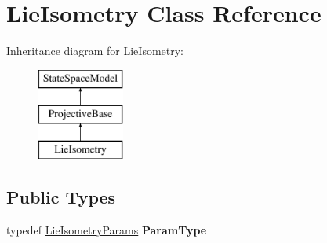 \hypertarget{classLieIsometry}{\section{Lie\-Isometry Class Reference}
\label{classLieIsometry}
}
Inheritance diagram for Lie\-Isometry\-:\begin{figure}[H]
\begin{center}
\leavevmode
\includegraphics[height=3.000000cm]{classLieIsometry}
\end{center}
\end{figure}
\subsection*{Public Types}
\begin{DoxyCompactItemize}
\item 
\hypertarget{classLieIsometry_afbaaa2c77ab69459280d40abe3621749}{typedef \hyperlink{structLieIsometryParams}{Lie\-Isometry\-Params} {\bfseries Param\-Type}}\label{classLieIsometry_afbaaa2c77ab69459280d40abe3621749}

\end{DoxyCompactItemize}
